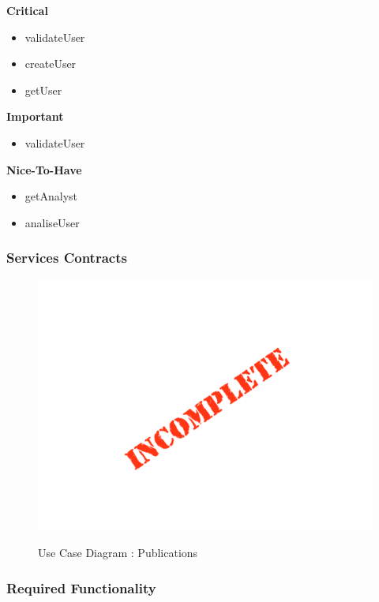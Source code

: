 \documentclass{article}
\begin{document}
		\begin{flushleft}
			\textbf{Critical}
				\begin{itemize}
	  				\item validateUser
	  				\item createUser
	  				\item getUser
				\end{itemize}
			\textbf{Important}
				\begin{itemize}
	  				\item validateUser
				\end{itemize}

			\textbf{Nice-To-Have}
				\begin{itemize}
	  				\item getAnalyst
	  				\item analiseUser
				\end{itemize}
		\end{flushleft}

		\subsubsection{Services Contracts}

		\begin{figure}[H]
		\includegraphics[width=\textwidth]{images/Incomplete.png}  \\
		\caption{Use Case Diagram : Publications}
		\end{figure}

		\subsubsection{Required Functionality}
\end{document}
